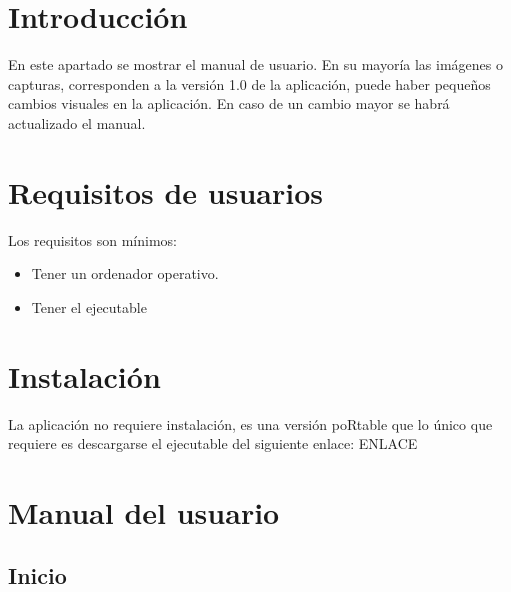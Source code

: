 
\section{Introducción}
En este apartado se mostrar el manual de usuario. En su mayoría las imágenes o capturas, corresponden a la versión 1.0 de la aplicación, puede haber pequeños cambios visuales en la aplicación. En caso de un cambio mayor se habrá actualizado el manual.
\section{Requisitos de usuarios}
Los requisitos son mínimos:
\begin{itemize}
\item Tener un ordenador operativo.
\item Tener el ejecutable
\end{itemize}
\section{Instalación}
La aplicación no requiere instalación, es una versión poRtable que lo único que requiere es descargarse el ejecutable del siguiente enlace: ENLACE
\section{Manual del usuario}
\subsection{Inicio}
